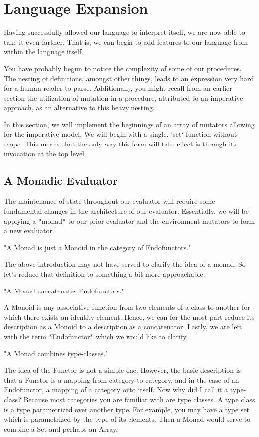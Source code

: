 \section{Language Expansion}
Having successfully allowed our language to interpret itself, we are now able
to take it even farther. That is, we can begin to add features to our
language from within the language itself.

You have probably begun to notice the complexity of some of our procedures.
The nesting of definitions, amongst other things, leads to an expression very
hard for a human reader to parse. Additionally, you might recall from an
earlier section the utilization of mutation in a procedure, attributed to an
imperative approach, as an alternative to this heavy nesting.

In this section, we will implement the beginnings of an array of mutators
allowing for the imperative model. We will begin with a single, `set` 
function without scope. This means that the only way this form will take
effect is through its invocation at the top level.

\subsection{A Monadic Evaluator}
The maintenance of state throughout our evaluator will require some 
fundamental changes in the architecture of our evaluator. Essentially, we 
will be applying a *monad* to our prior evaluator and the environment 
mutators to form a new evaluator.

"A Monad is just a Monoid in the category of Endofunctors."

The above introduction may not have served to clarify the idea of a monad. So
let's reduce that definition to something a bit more approachable.

"A Monad concatenates Endofunctors."

A Monoid is any associative function from two elements of a class to another
for which there exists an identity element. Hence, we can for the most part
reduce its description as a Monoid to a description as a concatenator. 
Lastly, we are left with the term *Endofunctor* which we would like to 
clarify.

"A Monad combines type-classes."

The idea of the Functor is not a simple one. However, the basic description
is that a Functor is a mapping from category to category, and in the case of
an Endofunctor, a mapping of a category onto itself. Now why did I call it a
type-class? Because most categories you are familiar with are type classes.
A type class is a type parametrized over another type. For example, you may
have a type set which is parametrized by the type of its elements. Then a
Monad would serve to combine a Set and perhaps an Array.

